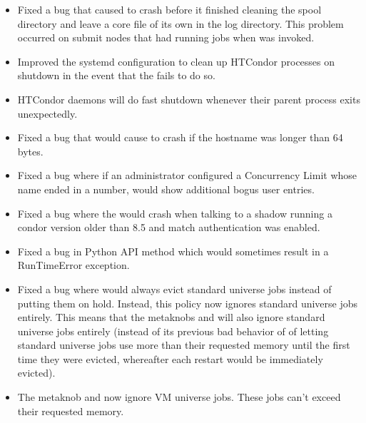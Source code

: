 \begin{itemize}

\item Fixed a bug that caused  to crash before it finished
cleaning the spool directory and leave a core file of its own in the log
directory.
This problem occurred on submit nodes that had running jobs when
 was invoked.

\item Improved the systemd configuration to clean up HTCondor processes
on shutdown in the event that the  fails to do so.

\item HTCondor daemons will do fast shutdown whenever their parent process
exits unexpectedly.

\item Fixed a bug that would cause  to crash if the hostname
was longer than 64 bytes.

\item Fixed a bug where if an administrator configured a Concurrency Limit
whose name ended in a number,   would show
additional bogus user entries.

\item Fixed a bug where the  would crash when talking
to a shadow running a condor version older than 8.5 and match authentication
was enabled.

\item Fixed a bug in Python API  method which
would sometimes result in a RunTimeError exception.

\item Fixed a bug where  would always
evict standard universe jobs instead of putting them on hold.  Instead,
this policy now ignores standard universe jobs entirely.  This means
that the metaknobs  and
 will also ignore
standard universe jobs entirely (instead of its previous bad behavior
of of letting standard universe jobs use more than their requested
memory until the first time they were evicted, whereafter each restart
would be immediately evicted).

\item The metaknob  and
 now ignore VM universe
jobs.  These jobs can't exceed their requested memory.


\end{itemize}
